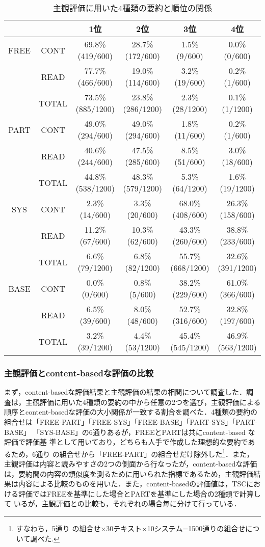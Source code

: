 \begin{table*}[t]
\caption{主観評価に用いた4種類の要約と順位の関係\label{table:ordera2}}
\begin{center}
{\scriptsize
\begin{tabular}{|c|c|c|c|c|c|}\hline
      && 1位 & 2位 & 3位 & 4位 \\ \hline\hline
 FREE & CONT& 69.8\%(419/600) & 28.7\%(172/600) & 1.5\%(9/600) & 0.0\%(0/600)\\
      & READ & 77.7\%(466/600) & 19.0\%(114/600) & 3.2\%(19/600) & 0.2\%(1/600)\\\cline{2-6}
      & TOTAL& 73.5\%(885/1200) & 23.8\%(286/1200) & 2.3\%(28/1200) & 0.1\%(1/1200)\\ \hline\hline
 PART & CONT& 49.0\%(294/600) & 49.0\%(294/600) & 1.8\%(11/600) & 0.2\%(1/600)\\
      & READ& 40.6\%(244/600) & 47.5\%(285/600) & 8.5\%(51/600) & 3.0\%(18/600)\\\cline{2-6}
      & TOTAL& 44.8\%(538/1200) & 48.3\%(579/1200) &  5.3\%(64/1200) & 1.6\%(19/1200)\\ \hline\hline
 SYS  & CONT& 2.3\%(14/600) & 3.3\%(20/600) & 68.0\%(408/600) & 26.3\%(158/600)\\
      & READ& 11.2\%(67/600) & 10.3\%(62/600) & 43.3\%(260/600) & 38.8\%(233/600)\\\cline{2-6}
      & TOTAL&  6.6\%(79/1200)  &  6.8\%(82/1200) & 55.7\%(668/1200) & 32.6\%(391/1200)\\ \hline\hline
 BASE & CONT& 0.0\%(0/600) & 0.8\%(5/600) & 38.2\%(229/600) & 61.0\%(366/600)\\
      & READ& 6.5\%(39/600) & 8.0\%(48/600) & 52.7\%(316/600) & 32.8\%(197/600)\\\cline{2-6}
      & TOTAL& 3.2\%(39/1200)  &  4.4\%(53/1200) & 45.4\%(545/1200) & 46.9\%(563/1200)\\ \hline
\end{tabular}
}
\end{center}
\end{table*}

\subsubsection*{主観評価とcontent-basedな評価の比較}

まず，content-basedな評価結果と主観評価の結果の相関について調査した．調
査は，主観評価に用いた4種類の要約の中から任意の2つを選び，主観評価による
順序とcontent-basedな評価の大小関係が一致する割合を調べた．4種類の要約の
組合せは「FREE-PART」「FREE-SYS」「FREE-BASE」「PART-SYS」「PART-BASE」
「SYS-BASE」の6通りあるが，FREEとPARTは共にcontent-based な評価で評価基
準として用いており，どちらも人手で作成した理想的な要約であるため，6通り
の組合せから「FREE-PART」の組合せだけ除外した\footnote {すなわち，5通り
の組合せ×30テキスト×10システム=1500通りの組合せについて調べた.}．また，
主観評価は内容と読みやすさの2つの側面から行なったが，content-basedな評価
は，要約間の内容の類似度を測るために用いられた指標であるため，主観評価結
果は内容による比較のものを用いた．また，content-basedの評価値は，TSCにお
ける評価ではFREEを基準にした場合とPARTを基準にした場合の2種類で計算して
いるが，主観評価との比較も，それぞれの場合毎に分けて行っている．

